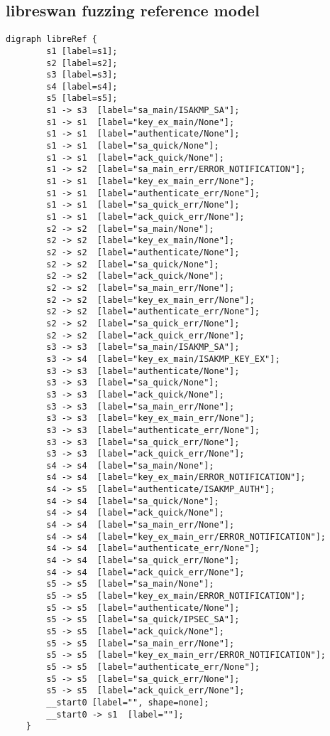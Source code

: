 \begin{appendices}
\subsection*{libreswan fuzzing reference model}
\begin{lstlisting}[numbers=none]
	digraph libreRef {
		s1 [label=s1];
		s2 [label=s2];
		s3 [label=s3];
		s4 [label=s4];
		s5 [label=s5];
		s1 -> s3  [label="sa_main/ISAKMP_SA"];
		s1 -> s1  [label="key_ex_main/None"];
		s1 -> s1  [label="authenticate/None"];
		s1 -> s1  [label="sa_quick/None"];
		s1 -> s1  [label="ack_quick/None"];
		s1 -> s2  [label="sa_main_err/ERROR_NOTIFICATION"];
		s1 -> s1  [label="key_ex_main_err/None"];
		s1 -> s1  [label="authenticate_err/None"];
		s1 -> s1  [label="sa_quick_err/None"];
		s1 -> s1  [label="ack_quick_err/None"];
		s2 -> s2  [label="sa_main/None"];
		s2 -> s2  [label="key_ex_main/None"];
		s2 -> s2  [label="authenticate/None"];
		s2 -> s2  [label="sa_quick/None"];
		s2 -> s2  [label="ack_quick/None"];
		s2 -> s2  [label="sa_main_err/None"];
		s2 -> s2  [label="key_ex_main_err/None"];
		s2 -> s2  [label="authenticate_err/None"];
		s2 -> s2  [label="sa_quick_err/None"];
		s2 -> s2  [label="ack_quick_err/None"];
		s3 -> s3  [label="sa_main/ISAKMP_SA"];
		s3 -> s4  [label="key_ex_main/ISAKMP_KEY_EX"];
		s3 -> s3  [label="authenticate/None"];
		s3 -> s3  [label="sa_quick/None"];
		s3 -> s3  [label="ack_quick/None"];
		s3 -> s3  [label="sa_main_err/None"];
		s3 -> s3  [label="key_ex_main_err/None"];
		s3 -> s3  [label="authenticate_err/None"];
		s3 -> s3  [label="sa_quick_err/None"];
		s3 -> s3  [label="ack_quick_err/None"];
		s4 -> s4  [label="sa_main/None"];
		s4 -> s4  [label="key_ex_main/ERROR_NOTIFICATION"];
		s4 -> s5  [label="authenticate/ISAKMP_AUTH"];
		s4 -> s4  [label="sa_quick/None"];
		s4 -> s4  [label="ack_quick/None"];
		s4 -> s4  [label="sa_main_err/None"];
		s4 -> s4  [label="key_ex_main_err/ERROR_NOTIFICATION"];
		s4 -> s4  [label="authenticate_err/None"];
		s4 -> s4  [label="sa_quick_err/None"];
		s4 -> s4  [label="ack_quick_err/None"];
		s5 -> s5  [label="sa_main/None"];
		s5 -> s5  [label="key_ex_main/ERROR_NOTIFICATION"];
		s5 -> s5  [label="authenticate/None"];
		s5 -> s5  [label="sa_quick/IPSEC_SA"];
		s5 -> s5  [label="ack_quick/None"];
		s5 -> s5  [label="sa_main_err/None"];
		s5 -> s5  [label="key_ex_main_err/ERROR_NOTIFICATION"];
		s5 -> s5  [label="authenticate_err/None"];
		s5 -> s5  [label="sa_quick_err/None"];
		s5 -> s5  [label="ack_quick_err/None"];
		__start0 [label="", shape=none];
		__start0 -> s1  [label=""];
	}
\end{lstlisting}
\newpage





\end{appendices}